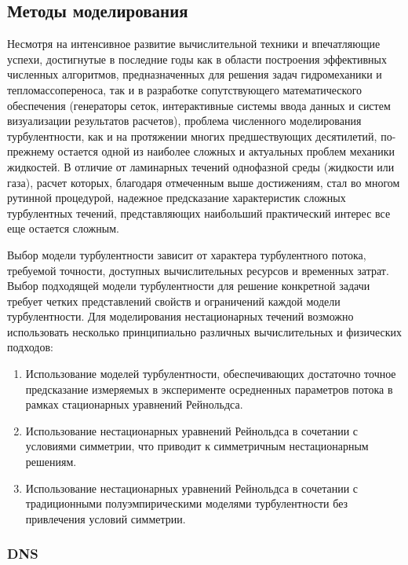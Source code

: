 \documentclass[a4paper]{article}
\begin{document}
	\subsection{Методы моделирования}
	
		Несмотря на интенсивное развитие вычислительной техники и впечатляющие успехи, достигнутые в последние годы как в области построения эффективных численных алгоритмов, предназначенных для решения задач гидромеханики и тепломассопереноса, так и в разработке сопутствующего математического обеспечения (генераторы сеток, интерактивные системы ввода данных и систем визуализации результатов расчетов), проблема численного моделирования турбулентности, как и на протяжении многих предшествующих десятилетий, по-прежнему остается одной из наиболее сложных и актуальных проблем механики жидкостей. В отличие от ламинарных течений однофазной среды (жидкости или газа), расчет которых, благодаря отмеченным выше достижениям, стал во многом рутинной процедурой, надежное предсказание характеристик сложных турбулентных течений, представляющих наибольший практический интерес все еще остается сложным.
	
		Выбор модели турбулентности зависит от характера турбулентного потока, требуемой точности, доступных вычислительных ресурсов и временных затрат. Выбор подходящей модели турбулентности для решение конкретной задачи требует четких представлений свойств и ограничений каждой модели турбулентности. Для моделирования нестационарных течений возможно использовать несколько принципиально различных вычислительных и физических подходов:
		\begin{enumerate}
			\item Использование моделей турбулентности, обеспечивающих достаточно точное предсказание измеряемых в эксперименте осредненных параметров потока в рамках стационарных уравнений Рейнольдса.
			\item Использование нестационарных уравнений Рейнольдса в сочетании с условиями симметрии, что приводит к симметричным нестационарным решениям.
			\item Использование нестационарных уравнений Рейнольдса в сочетании с традиционными полуэмпирическими моделями турбулентности без привлечения условий симметрии.
		\end{enumerate}
	
	\subsubsection{DNS}
	
\end{document}
